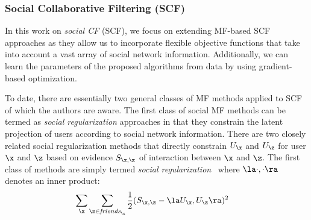 
\subsubsection{Social Collaborative Filtering (SCF)}
\label{sec:scf_original}

In this work on \emph{social CF} (SCF), we %
focus on extending
MF-based SCF 
approaches as  they allow us to incorporate flexible 
objective functions that take into account a vast array of social
network information. Additionally, we can learn the parameters 
of the proposed algorithms from data by using
gradient-based optimization.


To date, there are essentially two general classes of MF methods
applied to SCF of which the authors are aware.  
The first class of social MF methods can be termed as \emph{social
regularization} approaches in that they %
constrain the latent
projection of users according to social network information.  There
are two closely related social regularization methods that directly
constrain $U_\x$ and $U_\z$ for user $\x$ and $\z$ based on evidence
$S_{\x,\z}$ of interaction between $\x$ and $\z$.  The first class of
methods are simply termed \emph{social
regularization}~\cite{lla,socinf} where $\la \cdot, \cdot \ra$ denotes an inner
product:
\begin{align}
\sum_{\x} & \sum_{\z \in \mathit{friends}_\x} \frac{1}{2} (S_{\x,\z} - \la U_\x, U_\z \ra)^2 \label{eq:simple_sr}
\end{align}
%

